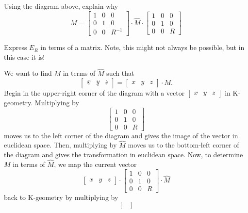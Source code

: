 \documentclass[newpage,hints,handout,noauthor,nooutcomes,12pt]{ximera}
\begin{document}
\begin{problem}
Using the diagram above, explain why%
\[
M
=\begin{bmatrix}
1 & 0 & 0\\
0 & 1 & 0\\
0 & 0 & R^{-1}
\end{bmatrix}
  \cdot\hat{M}\cdot\begin{bmatrix}
%
1 & 0 & 0\\
0 & 1 & 0\\
0 & 0 & R
\end{bmatrix}
\]
\begin{hint}
  Express $E_R$ in terms of a matrix. Note, this might not always be
  possible, but in this case it is!
\end{hint}

\begin{freeResponse}
We want to find $M$ in terms of $\hat{M}$ such that 
\[
\begin{bmatrix}
\underline{x} & \underline{y} & \underline{z}%
\end{bmatrix}
=\begin{bmatrix}
x & y & z
\end{bmatrix}
\cdot M.
\]
Begin in the upper-right corner of the diagram with a vector
$\begin{bmatrix}
x & y & z
\end{bmatrix}
$ in K-geometry. Multiplying by 
\[
\begin{bmatrix}
1 & 0 & 0\\
0 & 1 & 0\\
0 & 0 & R
\end{bmatrix}
\]
moves us to the left corner of the diagram and gives the image of the
vector in euclidean space. Then, multiplying by $\hat{M}$ moves us to
the bottom-left corner of the diagram and gives the transformation in
euclidean space. Now, to determine $M$ in terms of $\hat{M}$, we map
the current vector
\[
\begin{bmatrix}
x & y & z
\end{bmatrix}
  \cdot\begin{bmatrix}
%
1 & 0 & 0\\
0 & 1 & 0\\
0 & 0 & R
\end{bmatrix}
  \cdot\hat{M}
  \]
back to K-geometry by multiplying by 
\[
\begin{bmatrix}

\end{bmatrix}\]
\end{freeResponse}
\end{problem}
\end{document}
